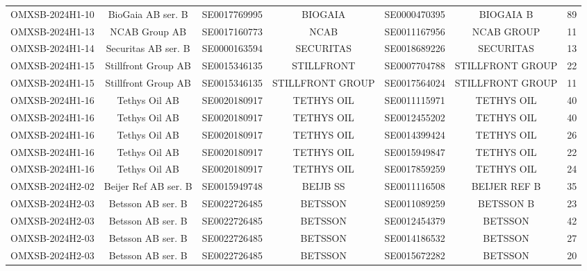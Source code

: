 \begin{threeparttable}
\begin{tabular}{@{}lcccccc}
\addlinespace[0.25ex]
\addlinespace[0.25ex]
OMXSB-2024H1-10 & BioGaia AB ser. B & SE0017769995 & BIOGAIA & SE0000470395 & BIOGAIA B & 89 \\
\addlinespace[0.25ex]
\addlinespace[0.25ex]
OMXSB-2024H1-13 & NCAB Group AB & SE0017160773 & NCAB & SE0011167956 & NCAB GROUP & 11 \\
\addlinespace[0.25ex]
\addlinespace[0.25ex]
OMXSB-2024H1-14 & Securitas AB ser. B & SE0000163594 & SECURITAS & SE0018689226 & SECURITAS & 13 \\
\addlinespace[0.25ex]
\addlinespace[0.25ex]
OMXSB-2024H1-15 & Stillfront Group AB & SE0015346135 & STILLFRONT & SE0007704788 & STILLFRONT GROUP & 22 \\
\addlinespace[0.25ex]
\addlinespace[0.25ex]
OMXSB-2024H1-15 & Stillfront Group AB & SE0015346135 & STILLFRONT GROUP & SE0017564024 & STILLFRONT GROUP & 11 \\
\addlinespace[0.25ex]
\addlinespace[0.25ex]
OMXSB-2024H1-16 & Tethys Oil AB & SE0020180917 & TETHYS OIL & SE0011115971 & TETHYS OIL & 40 \\
\addlinespace[0.25ex]
\addlinespace[0.25ex]
OMXSB-2024H1-16 & Tethys Oil AB & SE0020180917 & TETHYS OIL & SE0012455202 & TETHYS OIL & 40 \\
\addlinespace[0.25ex]
\addlinespace[0.25ex]
OMXSB-2024H1-16 & Tethys Oil AB & SE0020180917 & TETHYS OIL & SE0014399424 & TETHYS OIL & 26 \\
\addlinespace[0.25ex]
\addlinespace[0.25ex]
OMXSB-2024H1-16 & Tethys Oil AB & SE0020180917 & TETHYS OIL & SE0015949847 & TETHYS OIL & 22 \\
\addlinespace[0.25ex]
\addlinespace[0.25ex]
OMXSB-2024H1-16 & Tethys Oil AB & SE0020180917 & TETHYS OIL & SE0017859259 & TETHYS OIL & 24 \\
\addlinespace[0.25ex]
\addlinespace[0.25ex]
OMXSB-2024H2-02 & Beijer Ref AB ser. B & SE0015949748 & BEIJB SS & SE0011116508 & BEIJER REF B & 35 \\
\addlinespace[0.25ex]
\addlinespace[0.25ex]
OMXSB-2024H2-03 & Betsson AB ser. B & SE0022726485 & BETSSON & SE0011089259 & BETSSON B & 23 \\
\addlinespace[0.25ex]
\addlinespace[0.25ex]
OMXSB-2024H2-03 & Betsson AB ser. B & SE0022726485 & BETSSON & SE0012454379 & BETSSON & 42 \\
\addlinespace[0.25ex]
\addlinespace[0.25ex]
OMXSB-2024H2-03 & Betsson AB ser. B & SE0022726485 & BETSSON & SE0014186532 & BETSSON & 27 \\
\addlinespace[0.25ex]
\addlinespace[0.25ex]
OMXSB-2024H2-03 & Betsson AB ser. B & SE0022726485 & BETSSON & SE0015672282 & BETSSON & 20 \\

\end{tabular}
\end{threeparttable}
